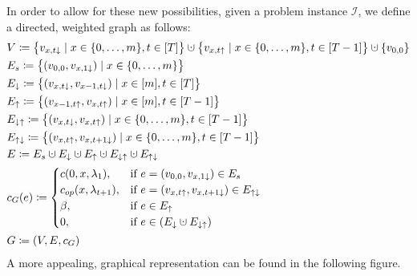 \documentclass[hidelinks]{article}
\theoremstyle{plain}
\theoremstyle{definition}
\theoremstyle{rem}
\newcommand{\inp}{\mathcal{I}}
\newcommand{\costs}{c}
\newcommand{\opcosts}{c_{op}}
\newcommand{\fromto}[2]{\{#1,\ldots,#2\}}
\newcommand{\dotcup}{\mathbin{\mathaccent\cdot\cup}}
\begin{document}
In order to allow for these new possibilities, given a problem instance $\inp$, we define a directed, weighted graph as follows:
\begin{align*}
	&V\coloneqq\bigl\{v_{x,t\downarrow}\mid x\in\fromto{0}{m},t\in[T]\bigr\}\dotcup\bigl\{v_{x,t\uparrow}\mid x\in\fromto{0}{m},t\in[T-1]\bigr\}\dotcup\{v_{0,0}\}\\
	&E_s\coloneqq\bigl\{(v_{0,0},v_{x,1\downarrow})\mid x\in\fromto{0}{m}\bigr\}\\
	&E_\downarrow\coloneqq\bigl\{(v_{x,t\downarrow},v_{x-1,t\downarrow})\mid x\in[m],t\in[T]\bigr\}\\
	&E_\uparrow\coloneqq\bigl\{(v_{x-1,t\uparrow},v_{x,t\uparrow})\mid x\in[m],t\in[T-1]\bigr\}\\
	&E_{\downarrow\uparrow}\coloneqq\bigl\{(v_{x,t\downarrow},v_{x,t\uparrow})\mid x\in\fromto{0}{m},t\in[T-1]\bigr\}\\
	&E_{\uparrow\downarrow}\coloneqq\bigl\{(v_{x,t\uparrow},v_{x,t+1\downarrow})\mid x\in\fromto{0}{m},t\in[T-1]\bigr\}\\
	&E\coloneqq E_s\dotcup E_\downarrow\dotcup E_\uparrow\dotcup E_{\downarrow\uparrow}\dotcup E_{\uparrow\downarrow}\\
	&c_G(e)\coloneqq
	\begin{cases}
		\costs(0,x,\lambda_1), & \text{if $e=(v_{0,0},v_{x,1\downarrow})\in E_s$}\\
		\opcosts(x,\lambda_{t+1}), & \text{if $e=(v_{x,t\uparrow},v_{x,t+1\downarrow})\in E_{\uparrow\downarrow}$}\\
		\beta, & \text{if $e\in E_\uparrow$}\\
		0, & \text{if $e\in(E_\downarrow\dotcup E_{\downarrow\uparrow})$}
	\end{cases}\\
	&G\coloneqq(V,E,c_G)
\end{align*}
A more appealing, graphical representation can be found in the following figure.
\end{document}
